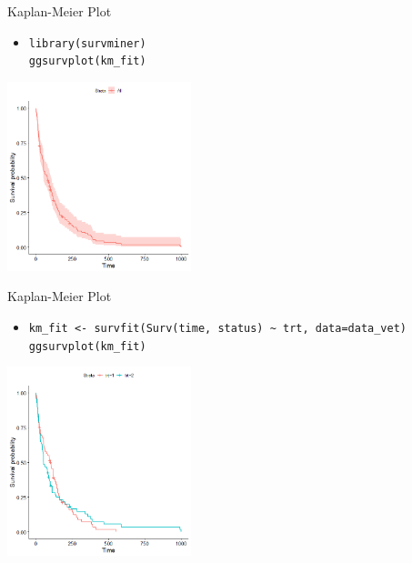 \documentclass[xcolor=dvipsnames, aspectratio = 169]{beamer}
\begin{document}
\begin{frame}[fragile]{Kaplan-Meier Plot}
	\begin{itemize}
		\item \verb+library(survminer)+ \\ \verb+ggsurvplot(km_fit)+
	\end{itemize}
			
	\begin{center}
		\includegraphics[height=5.5cm]{KM2}
	\end{center}
\end{frame}

\begin{frame}[fragile]{Kaplan-Meier Plot}
	\begin{itemize}
		\item \verb+km_fit <- survfit(Surv(time, status) ~ trt, data=data_vet)+ \\ \verb+ggsurvplot(km_fit)+
	\end{itemize}
			
	\begin{center}
		\includegraphics[height=5.5cm]{KM3}
	\end{center}
\end{frame}
\end{document}
